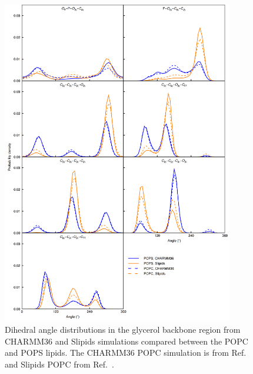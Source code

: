 \documentclass[journal=jpcbfk,manuscript=article]{achemso}
\begin{document}
\begin{figure}[]
  \centering
  \includegraphics[width=0.9\textwidth]{../Figs/figS10.png}
  \caption{\label{dihedralsGLYpc}
    Dihedral angle distributions in the glycerol backbone region from CHARMM36 and Slipids simulations
    compared between the POPC and POPS lipids.
    The CHARMM36 POPC simulation is from Ref.~ and Slipids POPC from Ref.~.
  }
\end{figure}
\end{document}
